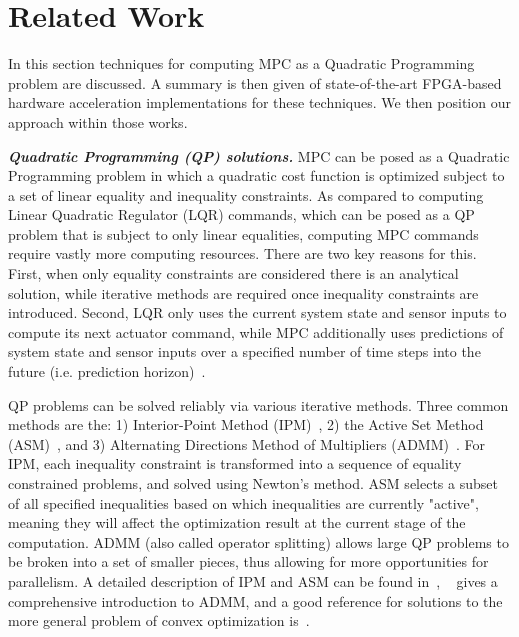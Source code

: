 \section{Related Work}\label{rw}
In this section techniques for computing MPC as a Quadratic Programming problem are discussed. A summary is then given of state-of-the-art FPGA-based hardware acceleration implementations for these techniques. We then position our approach within those works. 

\textbf{\textit{Quadratic Programming (QP) solutions.}}
MPC can be posed as a Quadratic Programming problem in which a quadratic cost function is optimized subject to a set of linear equality and inequality constraints. As compared to computing Linear Quadratic Regulator (LQR) commands, which can be posed as a QP problem that is subject to only linear equalities, computing MPC commands require vastly more computing resources. There are two key reasons for this. First, when only equality constraints are considered there is an analytical solution, while iterative methods are required once inequality constraints are introduced. Second, LQR only uses the current system state and sensor inputs to compute its next actuator command, while MPC additionally uses predictions of system state and sensor inputs over a specified number of time steps into the future (i.e. prediction horizon)~\cite{Kwakernaak:1972:LOC:578807}.

QP problems can be solved reliably via various iterative methods. Three common methods are the: 1) Interior-Point Method (IPM)~\cite[Chapter~4.3.2]{borrelli2015predictive}, 2) the Active Set Method (ASM)~\cite[Chapter~4.3.3]{borrelli2015predictive}, and 3) Alternating Directions Method of Multipliers (ADMM)~\cite{boyd2011distributed,6422363}. For IPM, each inequality constraint is transformed into a sequence of equality constrained problems, and solved using Newton's method. ASM selects a subset of all specified inequalities based on which inequalities are currently "active", meaning they will affect the optimization result at the current stage of the computation. ADMM (also called operator splitting) allows large QP problems to be broken into a set of smaller pieces, thus allowing for more opportunities for parallelism. A detailed description of IPM and ASM can be found in~\cite{Nocedal2006NO}, ~\cite{boyd2011distributed} gives a comprehensive introduction to ADMM, and a good reference for solutions to the more general problem of convex optimization is~\cite{Boyd993483}.

